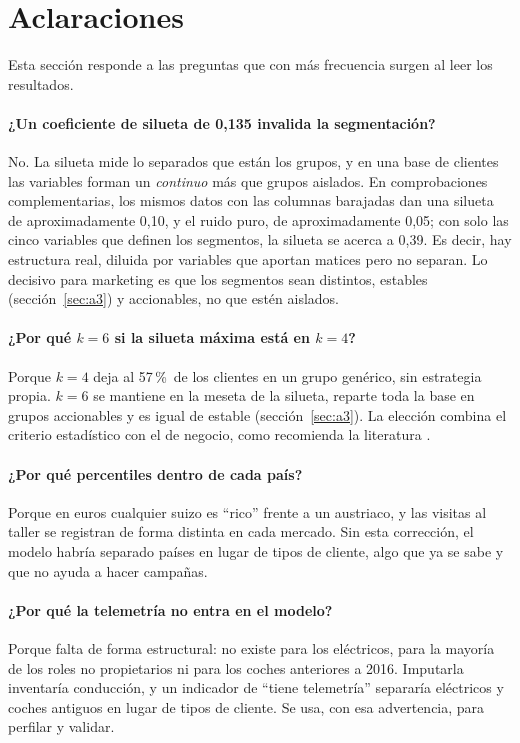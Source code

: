 \documentclass[11pt,a4paper]{article}
\newcommand{\pct}{\,\%}
\begin{document}
\section{Aclaraciones}\label{sec:aclaraciones}

Esta sección responde a las preguntas que con más frecuencia surgen al leer los resultados.

\paragraph{¿Un coeficiente de silueta de 0,135 invalida la segmentación?} No. La silueta mide lo separados que están los
grupos, y en una base de clientes las variables forman un \emph{continuo} más que grupos aislados. En comprobaciones
complementarias, los mismos datos con las columnas barajadas dan una silueta de aproximadamente 0,10, y el ruido puro,
de aproximadamente 0,05; con solo las cinco variables que definen los segmentos, la silueta se acerca a 0,39. Es decir,
hay estructura real, diluida por variables que aportan matices pero no separan. Lo decisivo para marketing es que los
segmentos sean distintos, estables (sección~\ref{sec:a3}) y accionables, no que estén aislados.

\paragraph{¿Por qué $k=6$ si la silueta máxima está en $k=4$?} Porque $k=4$ deja al 57\pct\ de los clientes en un grupo
genérico, sin estrategia propia. $k=6$ se mantiene en la meseta de la silueta, reparte toda la base en grupos
accionables y es igual de estable (sección~\ref{sec:a3}). La elección combina el criterio estadístico con el de negocio,
como recomienda la literatura \parencite{wedel2000}.

\paragraph{¿Por qué percentiles dentro de cada país?} Porque en euros cualquier suizo es \enquote{rico} frente a un
austriaco, y las visitas al taller se registran de forma distinta en cada mercado. Sin esta corrección, el modelo
habría separado países en lugar de tipos de cliente, algo que ya se sabe y que no ayuda a hacer campañas.

\paragraph{¿Por qué la telemetría no entra en el modelo?} Porque falta de forma estructural: no existe para los
eléctricos, para la mayoría de los roles no propietarios ni para los coches anteriores a 2016. Imputarla inventaría
conducción, y un indicador de \enquote{tiene telemetría} separaría eléctricos y coches antiguos en lugar de tipos de
cliente. Se usa, con esa advertencia, para perfilar y validar.
\end{document}
